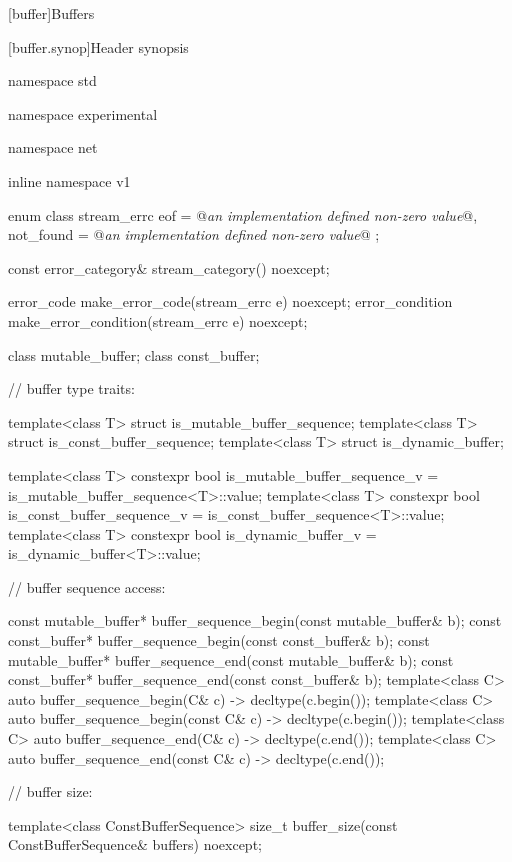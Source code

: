 
[buffer]{Buffers}


%
[buffer.synop]{Header  synopsis}

%
%
%
%
\begin{codeblock}
namespace std {
namespace experimental {
namespace net {
inline namespace v1 {

  enum class stream_errc {
    eof = @\textit{an implementation defined non-zero value}@,
    not_found = @\textit{an implementation defined non-zero value}@
  };

  const error_category& stream_category() noexcept;

  error_code make_error_code(stream_errc e) noexcept;
  error_condition make_error_condition(stream_errc e) noexcept;

  class mutable_buffer;
  class const_buffer;

  // buffer type traits:

  template<class T> struct is_mutable_buffer_sequence;
  template<class T> struct is_const_buffer_sequence;
  template<class T> struct is_dynamic_buffer;

  template<class T>
      constexpr bool is_mutable_buffer_sequence_v = is_mutable_buffer_sequence<T>::value;
    template<class T>
      constexpr bool is_const_buffer_sequence_v = is_const_buffer_sequence<T>::value;
    template<class T>
      constexpr bool is_dynamic_buffer_v = is_dynamic_buffer<T>::value;

  // buffer sequence access:

  const mutable_buffer* buffer_sequence_begin(const mutable_buffer& b);
  const const_buffer* buffer_sequence_begin(const const_buffer& b);
  const mutable_buffer* buffer_sequence_end(const mutable_buffer& b);
  const const_buffer* buffer_sequence_end(const const_buffer& b);
  template<class C> auto buffer_sequence_begin(C& c) -> decltype(c.begin());
  template<class C> auto buffer_sequence_begin(const C& c) -> decltype(c.begin());
  template<class C> auto buffer_sequence_end(C& c) -> decltype(c.end());
  template<class C> auto buffer_sequence_end(const C& c) -> decltype(c.end());

  // buffer size:

  template<class ConstBufferSequence>
    size_t buffer_size(const ConstBufferSequence& buffers) noexcept;

}}}}
\end{codeblock}
